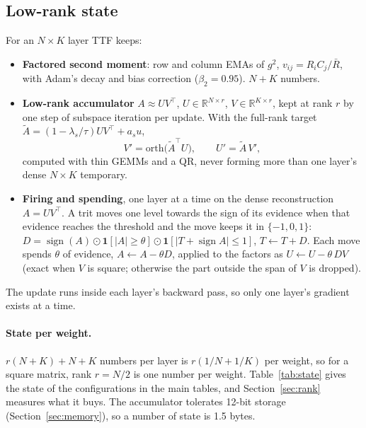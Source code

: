 \documentclass[10pt,twocolumn]{article}
\newcommand{\sign}{\operatorname{sign}}
\newcommand{\R}{\mathbb{R}}
\begin{document}
\subsection{Low-rank state}
For an $N\times K$ layer TTF keeps:
\begin{itemize}
\item \textbf{Factored second moment}: row and column EMAs of $g^2$, $v_{ij}=R_iC_j/\bar R$, with Adam's decay and bias
  correction ($\beta_2=0.95$). $N+K$ numbers.
\item \textbf{Low-rank accumulator} $A\approx UV^\top$, $U\in\R^{N\times r}$, $V\in\R^{K\times r}$, kept at rank $r$ by
  one step of subspace iteration per update. With the full-rank target $\tilde A=(1-\lambda_s/\tau)UV^\top + a_s u$,
  \begin{equation}
    V' = \mathrm{orth}\big(\tilde A^\top U\big), \qquad U' = \tilde A\,V',
  \end{equation}
  computed with thin GEMMs and a QR, never forming more than one layer's dense $N\times K$ temporary.
\item \textbf{Firing and spending}, one layer at a time on the dense reconstruction $A=UV^\top$. A trit moves one
  level towards the sign of its evidence when that evidence reaches the threshold and the move keeps it in
  $\{-1,0,1\}$: $D=\sign(A)\odot\mathbf 1[|A|\ge\theta]\odot\mathbf 1[|T+\sign A|\le1]$, $T\leftarrow T+D$. Each move
  spends $\theta$ of evidence, $A\leftarrow A-\theta D$, applied to the factors as $U\leftarrow U-\theta\,DV$ (exact
  when $V$ is square; otherwise the part outside the span of $V$ is dropped).
\end{itemize}
The update runs inside each layer's backward pass, so only one layer's gradient exists at a time.

\paragraph{State per weight.} $r(N+K)+N+K$ numbers per layer is $r(1/N+1/K)$ per weight, so for a square matrix, rank $r=N/2$
is one number per weight. Table~\ref{tab:state} gives the state of the configurations in the main tables, and
Section~\ref{sec:rank} measures what it buys. The accumulator tolerates 12-bit storage (Section~\ref{sec:memory}), so a number of state is 1.5
bytes.
\end{document}
